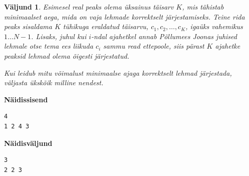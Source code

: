 \documentclass{trkut}
\newtheorem*{Output}{Väljund}
\begin{document}
\begin{Output}
Esimesel real peaks olema üksainus täisarv $K$, mis tähistab minimaalset aega, mida on vaja lehmade korrektselt järjestamiseks.
Teine rida peaks sisaldama $K$ tühikuga eraldatud täisarvu, $c_1,c_2,…,c_K$, igaüks vahemikus $1…N−1$. Lisaks, juhul kui $i$-ndal ajahetkel annab Põllumees Joonas juhised lehmale otse tema ees liikuda $c_i$ sammu read ettepoole, siis pärast $K$ ajahetke peaksid lehmad olema õigesti järjestatud.

Kui leidub mitu võimalust minimaalse ajaga korrektselt lehmad järjestada, väljasta ükskõik milline nendest.
\end{Output}



\textbf{Näidissisend}

\begin{verbatim}
4
1 2 4 3
\end{verbatim}

\textbf{Näidisväljund}

\begin{verbatim}
3
2 2 3
\end{verbatim}
\end{document}
